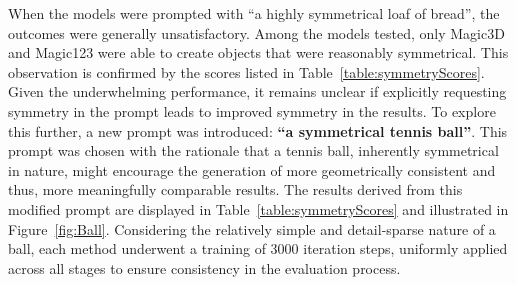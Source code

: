 When the models were prompted with ``a highly symmetrical loaf of bread'', the outcomes were generally unsatisfactory. Among the models tested, only Magic3D and Magic123 were able to create objects that were reasonably symmetrical. This observation is confirmed by the scores listed in Table~\ref{table:symmetryScores}. Given the underwhelming performance, it remains unclear if explicitly requesting symmetry in the prompt leads to improved symmetry in the results. To explore this further, a new prompt was introduced: \textbf{``a symmetrical tennis ball''}. This prompt was chosen with the rationale that a tennis ball, inherently symmetrical in nature, might encourage the generation of more geometrically consistent and thus, more meaningfully comparable results. The results derived from this modified prompt are displayed in Table~\ref{table:symmetryScores} and illustrated in Figure~\ref{fig:Ball}. Considering the relatively simple and detail-sparse nature of a ball, each method underwent a training of 3000 iteration steps, uniformly applied across all stages to ensure consistency in the evaluation process.

